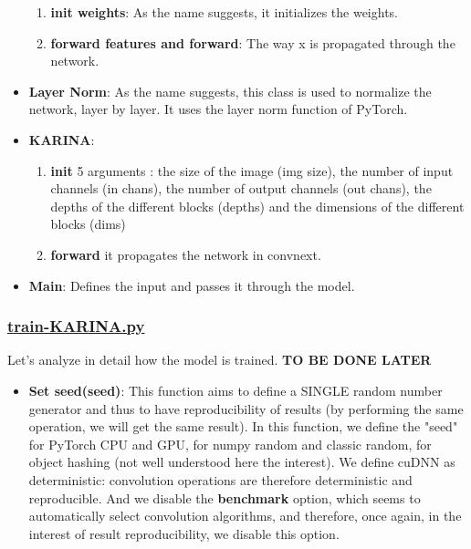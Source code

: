 \begin{itemize}
\begin{enumerate}
\item \textbf{init weights}: As the name suggests, it initializes the weights.
\item \textbf{forward features and forward}: The way x is propagated through the network.
\end{enumerate}
\item \textbf{Layer Norm}: As the name suggests, this class is used to normalize the network, layer by layer. It uses the layer norm function of PyTorch.
\item \textbf{KARINA}:
\begin{enumerate}
\item  \textbf{init} 5 arguments : the size of the image (img size), the number of input channels (in chans), the number of output channels (out chans), the depths of the different blocks (depths) and the dimensions of the different blocks (dims)
\item \textbf{forward} it propagates the network in convnext.
\end{enumerate}
\item \textbf{Main}: Defines the input and passes it through the model.
\end{itemize}

\subsubsection{\href{https://github.com/jmj2316/KARINA/blob/main/train_KARINA.py}{train-KARINA.py}}

Let's analyze in detail how the model is trained. \textbf{TO BE DONE LATER}\\

\begin{itemize}
\item \textbf{Set seed(seed)}: This function aims to define a SINGLE random number generator and thus to have reproducibility of results (by performing the same operation, we will get the same result). In this function, we define the "seed" for PyTorch CPU and GPU, for numpy random and classic random, for object hashing (not well understood here the interest). We define cuDNN as deterministic: convolution operations are therefore deterministic and reproducible. And we disable the \textbf{benchmark} option, which seems to automatically select convolution algorithms, and therefore, once again, in the interest of result reproducibility, we disable this option.
\end{itemize}